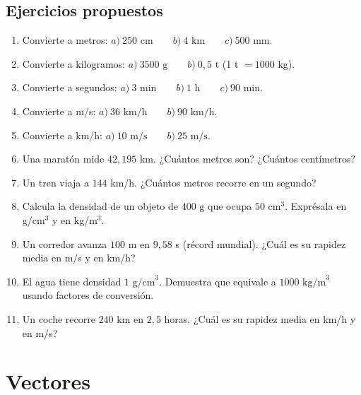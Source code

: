 \documentclass[12pt, letterpaper]{article}
\begin{document}
\newpage %

\subsection{Ejercicios propuestos}

\begin{enumerate}[leftmargin=*, resume]
  \item \facil{} Convierte a metros: $a)\ 250 \text{ cm} \qquad b)\ 4 \text{ km} \qquad c)\ 500 \text{ mm}$.

  \item \facil{} Convierte a kilogramos: $a)\ 3500 \text{ g} \qquad b)\ 0{,}5 \text{ t}$ (1 t $= 1000$ kg).

  \item \facil{} Convierte a segundos: $a)\ 3 \text{ min} \qquad b)\ 1 \text{ h} \qquad c)\ 90 \text{ min}$.

  \item \facil{} Convierte a m/s: $a)\ 36 \text{ km/h} \qquad b)\ 90 \text{ km/h}$.

  \item \medio{} Convierte a km/h: $a)\ 10 \text{ m/s} \qquad b)\ 25 \text{ m/s}$.

  \item \medio{} Una maratón mide $42{,}195$ km. ¿Cuántos metros son? ¿Cuántos centímetros?

  \item \medio{} Un tren viaja a $144$ km/h. ¿Cuántos metros recorre en un segundo?

  \item \medio{} Calcula la densidad de un objeto de $400 \text{ g}$ que ocupa $50 \text{ cm}^3$. Exprésala en g/cm$^3$ y en kg/m$^3$.

  \item \dificil{} Un corredor avanza $100$ m en $9{,}58$ s (récord mundial). ¿Cuál es su rapidez media en m/s y en km/h?

  \item \dificil{} El agua tiene densidad $1 \text{ g/cm}^3$. Demuestra que equivale a $1000 \text{ kg/m}^3$ usando factores de conversión.

  \item \dificil{} Un coche recorre $240$ km en $2{,}5$ horas. ¿Cuál es su rapidez media en km/h y en m/s?
\end{enumerate}

\section{Vectores}
\end{document}

